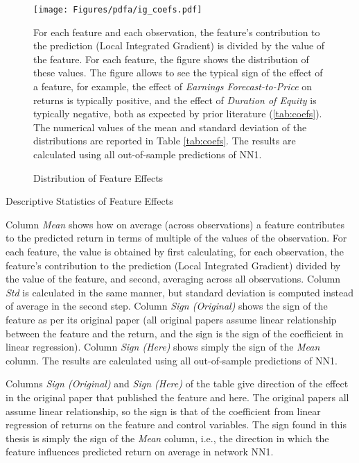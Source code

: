 	\begin{figure}
		\texttt{[image: Figures/pdfa/ig\_coefs.pdf]}
		\caption{Distribution of Feature Effects}
		\label{fig:coefs}
		\medskip
		\small
		For each feature and each observation, the feature's contribution to the prediction (Local Integrated Gradient) is divided by the value of the feature. For each feature, the figure shows the distribution of these values.   The figure allows to see the typical sign of the effect of a feature, for example, the effect of \textit{Earnings Forecast-to-Price} on returns is typically positive, and the effect of \textit{Duration of Equity} is typically negative, both as expected by prior literature (\ref{tab:coefs}). The numerical values of the mean and standard deviation of the distributions are reported in Table \ref{tab:coefs}. The results are calculated using all out-of-sample predictions of NN1. 
	\end{figure} 
	
	\begin{table}
		\resizebox{\textwidth}{!}{}
		\caption{Descriptive Statistics of Feature Effects}
		\label{tab:coefs}
		\medskip
		\small
		Column \textit{Mean} shows how on average (across observations) a feature contributes to the predicted return in terms of multiple of the values of the observation. For each feature, the value is obtained by first calculating, for each observation, the feature's contribution to the prediction (Local Integrated Gradient) divided by the value of the feature, and second, averaging across all observations. Column \textit{Std} is calculated in the same manner, but standard deviation is computed instead of average in the second step. Column \textit{Sign (Original)} shows the sign of the feature as per its original paper (all original papers assume linear relationship between the feature and the return, and the sign is the sign of the coefficient in linear regression). Column \textit{Sign (Here)} shows simply the sign of the \textit{Mean} column. The results are calculated using all out-of-sample predictions of NN1.
	\end{table}
	
	Columns \textit{Sign (Original)} and \textit{Sign (Here)} of the table give direction of the effect in the original paper that published the feature and here. The original papers all assume linear relationship, so the sign is that of the coefficient from linear regression of returns on the feature and control variables. The sign found in this thesis is simply the sign of the \textit{Mean} column, i.e., the direction in which the feature influences predicted return on average in network NN1. 
	

